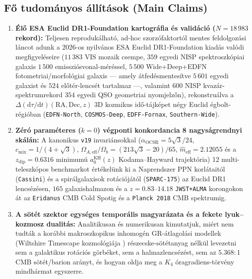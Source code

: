\documentclass[11pt,a4paper]{article}
\begin{document}
\subsection{Fő tudományos állítások (Main Claims)}
\begin{enumerate}
  \item \textbf{Élő ESA Euclid DR1-Foundation kartográfia és validáció ($N = 18\,983$ rekord):} Teljesen reprodukálható, ad-hoc szorzófaktortól mentes feldolgozási láncot adunk a 2026-os nyilvános ESA Euclid DR1-Foundation kiadás valódi megfigyeléseire ($11\,383$ VIS mozaik csempe, $359$ egyedi NISP spektroszkópiai galaxis $1\,500$ emissziósvonal-méréssel, $5\,500$ Wide+Deep+EDFN fotometriai/morfológiai galaxis --- amely átfedésmentesítve $5\,601$ egyedi galaxist és $524$ előtér-lencsét tartalmaz ---, valamint $600$ NISP kvazár-spektrumrekord $354$ egyedi QSO geometriai nyomjelzőn), rekonstruálva a $\Delta(\mathrm{d}\tau/\mathrm{d}t)(\mathrm{RA}, \mathrm{Dec}, z)$ 3D kozmikus idő-tájképet négy Euclid égbolt-régióban (\texttt{EDFN-North}, \texttt{COSMOS-Deep}, \texttt{EDFF-Fornax}, \texttt{Southern-Wide}).
  \item \textbf{Zéró paraméteres ($k = 0$) végponti konkordancia 8 nagyságrendnyi skálán:} A kanonikus \texttt{v19} invariánsokkal ($\alpha_{\mathrm{OCSR}} = 5\sqrt{3}/24$, $c_{\mathrm{mix}} = 1/(4+\sqrt{3})$, $\Omega_{A,\mathrm{eff}}/\Omega_b = (213\sqrt{3}-20)/65$, $\hat{m}_{\mathrm{eff}} = 2.12055$ és a $z_{\mathrm{dip}} = 0.6316$ minimumú $a_0^{\mathrm{KH}}(z)$ Kodama--Hayward trajektória) 12 multi-teleszkópos benchmarkot értékelünk ki a Naprendszer PPN korlátaitól (\texttt{Cassini}) és a spirálgalaxisok rotációjától (\texttt{SPARC-175}) az Euclid DR1 lencsézésen, $165$ galaxishalmazon és a $z = 0.83\text{--}14.18$ \texttt{JWST+ALMA} korongokon át az \texttt{Eridanus} CMB Cold Spotig és a \texttt{Planck 2018} CMB spektrumig.
  \item \textbf{A sötét szektor egységes temporális magyarázata és a fekete lyuk--kozmosz dualitás:} Analitikusan és numerikusan kimutatjuk, miért nem tudták a korábbi makroszkopikus inhomogén GR-átlagolási modellek (Wiltshire Timescape kozmológiája \cite{Wiltshire2007Timescape}) részecske-sötétanyag nélkül levezetni sem a galaktikus rotációs görbéket, sem a halmazlencsézést, sem az $5.368:1$ CMB sötét/barion arányt, és hogyan oldja meg a $K_4$ óragradiens-törvény mindhármat egyszerre.
\end{enumerate}
\end{document}
